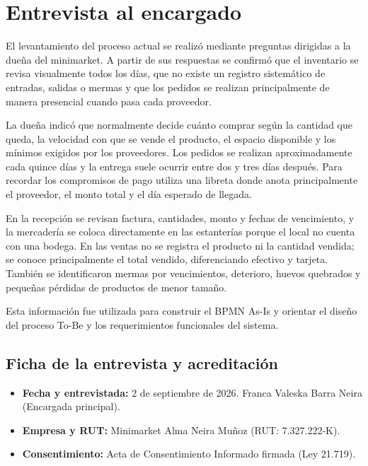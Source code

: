 \documentclass[10pt,a4paper]{article}
\begin{document}
\section{Entrevista al encargado}
El levantamiento del proceso actual se realizó mediante preguntas dirigidas a la dueña del minimarket. A partir de sus respuestas se confirmó que el inventario se revisa visualmente todos los días, que no existe un registro sistemático de entradas, salidas o mermas y que los pedidos se realizan principalmente de manera presencial cuando pasa cada proveedor.

La dueña indicó que normalmente decide cuánto comprar según la cantidad que queda, la velocidad con que se vende el producto, el espacio disponible y los mínimos exigidos por los proveedores. Los pedidos se realizan aproximadamente cada quince días y la entrega suele ocurrir entre dos y tres días después. Para recordar los compromisos de pago utiliza una libreta donde anota principalmente el proveedor, el monto total y el día esperado de llegada.

En la recepción se revisan factura, cantidades, monto y fechas de vencimiento, y la mercadería se coloca directamente en las estanterías porque el local no cuenta con una bodega. En las ventas no se registra el producto ni la cantidad vendida; se conoce principalmente el total vendido, diferenciando efectivo y tarjeta. También se identificaron mermas por vencimientos, deterioro, huevos quebrados y pequeñas pérdidas de productos de menor tamaño.

Esta información fue utilizada para construir el BPMN As-Is y orientar el diseño del proceso To-Be y los requerimientos funcionales del sistema.
\subsection{Ficha de la entrevista y acreditación}

\begin{itemize}
    \item \textbf{Fecha y entrevistada:} 2 de septiembre de 2026. Franca Valeska Barra Neira (Encargada principal).
    \item \textbf{Empresa y RUT:} Minimarket Alma Neira Muñoz (RUT: 7.327.222-K).
    \item \textbf{Consentimiento:} Acta de Consentimiento Informado firmada (Ley 21.719).
\end{itemize}
\end{document}
